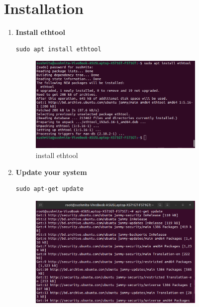 

\section{Installation}

\begin{enumerate}
 \item \textbf{Install ethtool}
    \begin{lstlisting}[style=bashstyle]
      sudo apt install ethtool
    \end{lstlisting}
  \begin{figure}[H]
  \centering
  \includegraphics[width=0.8\textwidth]
  {images/install/1_install_ethtool.png}
  \caption{install ethtool}
  \end{figure}
  \item \textbf{Update your system}
    \begin{lstlisting}[style=bashstyle]
      sudo apt-get update
    \end{lstlisting}
    \begin{figure}[H]
    \centering
    \includegraphics[width=0.8\textwidth]{images/install/2_apt_get_update.png}

\end{figure}
\end{enumerate}
